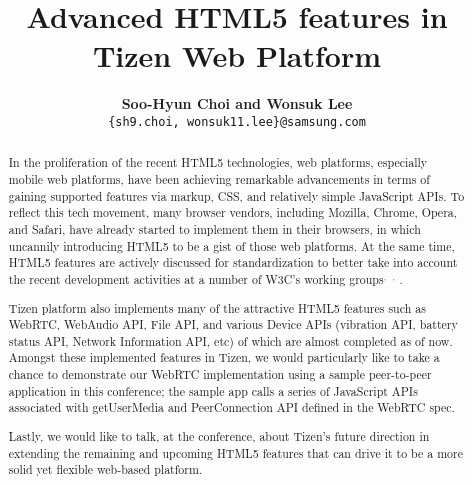 \documentclass[a4paper]{./cls/spie}  %
\title{Advanced HTML5 features in Tizen Web Platform}
\author{{\normalsize{\bf Soo-Hyun Choi and Wonsuk Lee}}
\skiplinehalf
{\sf {\normalsize Next Generation S/W R\&D Group\\ Samsung Electronics, Co., 
Ltd.}}\\
{\tt {\small \{sh9.choi, wonsuk11.lee\}@samsung.com}}
}
\begin{document}
\maketitle

\begin{abstract}

In the proliferation of the recent HTML5 technologies, web platforms, especially 
mobile web platforms, have been achieving remarkable advancements in terms of 
gaining supported features via markup, CSS, and relatively simple JavaScript 
APIs.  To reflect this tech movement, many browser vendors, including Mozilla, 
Chrome, Opera, and Safari, have already started to implement them in their 
browsers, in which uncannily introducing HTML5 to be a gist of those web 
platforms. At the same time, HTML5 features are actively discussed for 
standardization to better take into account the recent development activities at 
a number of W3C's working groups\cite{whatwg.w3c}$^{,}$~\cite{dapwg.w3c}$^{,}$
\cite{webrtcwg.w3c}.

Tizen platform also implements many of the attractive HTML5 features such as
WebRTC\cite{webrtc.w3c}, WebAudio API\cite{webaudioapi.w3c}, File 
API\cite{fileapi.w3c}, and various Device APIs (vibration 
API\cite{vibrationapi.w3c}, battery status API\cite{batteryapi.w3c}, Network 
Information API\cite{netinfoapi.w3c}, etc) of which are almost completed as of 
now.  Amongst these implemented features in Tizen, we would particularly like to 
take a chance to demonstrate our WebRTC implementation using a sample 
peer-to-peer application in this conference; the sample app calls a series of 
JavaScript APIs associated with {\sf getUserMedia}\cite{getusermedia.w3c} and 
{\sf PeerConnection API} defined in the WebRTC spec\cite{webrtc.w3c}.

Lastly, we would like to talk, at the conference, about Tizen's future direction 
in extending the remaining and upcoming HTML5 features that can drive it to be a 
more solid yet flexible web-based platform. \\


\end{abstract}


\\
\end{document}
